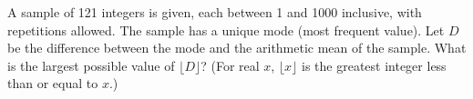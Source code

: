A sample of 121 integers is given, each between 1 and 1000 inclusive, with repetitions allowed. The sample has a unique mode (most frequent value). Let $D$ be the difference between the mode and the arithmetic mean of the sample. What is the largest possible value of $\lfloor D\rfloor$? (For real $x$, $\lfloor x\rfloor$ is the greatest integer less than or equal to $x$.)